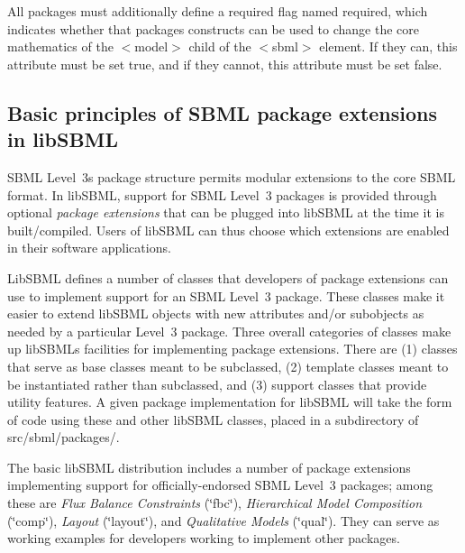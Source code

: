 All packages must additionally define a required flag named {\ttfamily required}, which indicates whether that package\textquotesingle{}s constructs can be used to change the core mathematics of the {\ttfamily $<$model$>$} child of the {\ttfamily $<$sbml$>$} element. If they can, this attribute must be set {\ttfamily true}, and if they cannot, this attribute must be set {\ttfamily false}.\hypertarget{classdoc__basics__of__extensions_ext-basics}{}\subsection{Basic principles of S\+B\+M\+L package extensions in lib\+S\+B\+ML}\label{classdoc__basics__of__extensions_ext-basics}
\begin{DoxyParagraph}{}
S\+B\+ML Level~3\textquotesingle{}s package structure permits modular extensions to the core S\+B\+ML format. In lib\+S\+B\+ML, support for S\+B\+ML Level~3 packages is provided through optional {\itshape package extensions} that can be plugged into lib\+S\+B\+ML at the time it is built/compiled. Users of lib\+S\+B\+ML can thus choose which extensions are enabled in their software applications.
\end{DoxyParagraph}
Lib\+S\+B\+ML defines a number of classes that developers of package extensions can use to implement support for an S\+B\+ML Level~3 package. These classes make it easier to extend lib\+S\+B\+ML objects with new attributes and/or subobjects as needed by a particular Level~3 package. Three overall categories of classes make up lib\+S\+B\+ML\textquotesingle{}s facilities for implementing package extensions. There are (1) classes that serve as base classes meant to be subclassed, (2) template classes meant to be instantiated rather than subclassed, and (3) support classes that provide utility features. A given package implementation for lib\+S\+B\+ML will take the form of code using these and other lib\+S\+B\+ML classes, placed in a subdirectory of {\ttfamily src/sbml/packages/}.

The basic lib\+S\+B\+ML distribution includes a number of package extensions implementing support for officially-\/endorsed S\+B\+ML Level~3 packages; among these are {\itshape Flux Balance Constraints} (\char`\"{}fbc\char`\"{}), {\itshape Hierarchical Model Composition} (\char`\"{}comp\char`\"{}), {\itshape Layout} (\char`\"{}layout\char`\"{}), and {\itshape Qualitative Models} (\char`\"{}qual\char`\"{}). They can serve as working examples for developers working to implement other packages.

